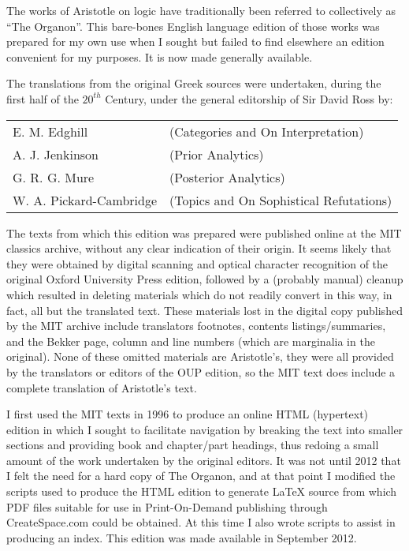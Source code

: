 The works of Aristotle on logic have traditionally been referred to collectively as ``The Organon''. 
This bare-bones English language edition of those works was prepared for my own use when I sought but failed to find elsewhere an edition convenient for my purposes.
It is now made generally available.
 
The translations from the original Greek sources were undertaken, during the first half of the \ensuremath{20^{th}} Century, under the general editorship of Sir David Ross by:

\vspace{0.2in}

\begin{centering}
\begin{tabular}{l l}
E. M. Edghill & (Categories and On Interpretation)\\
A. J. Jenkinson & (Prior Analytics)\\
G. R. G. Mure & (Posterior Analytics)\\
W. A. Pickard-Cambridge & (Topics and On Sophistical Refutations)
\end{tabular}
\end{centering}

\vspace{0.2in}

The texts from which this edition was prepared were published online at the MIT classics archive, without any clear indication of their origin.
It seems likely that they were obtained by digital scanning and optical character recognition of the original Oxford University Press edition, followed by a (probably manual) cleanup which resulted in deleting materials which do not readily convert in this way, in fact, all but the translated text.
These materials lost in the digital copy published by the MIT archive include translators footnotes, contents listings/summaries, and the Bekker page, column and line numbers (which are marginalia in the original).
None of these omitted materials are Aristotle's, they were all provided by the translators or editors of the OUP edition, so the MIT text does include a complete translation of Aristotle's text.

I first used the MIT texts in 1996 to produce an online HTML (hypertext) edition in which I sought to facilitate navigation by breaking the text into smaller sections and providing book and chapter/part headings, thus redoing a small amount of the work undertaken by the original editors.
It was not until 2012 that I felt the need for a hard copy of The Organon, and at that point I modified the scripts used to produce the HTML edition to generate {\LaTeX} source from which PDF files suitable for use in Print-On-Demand publishing through CreateSpace.com could be obtained.
At this time I also wrote scripts to assist in producing an index.
This edition was made available in September 2012.

